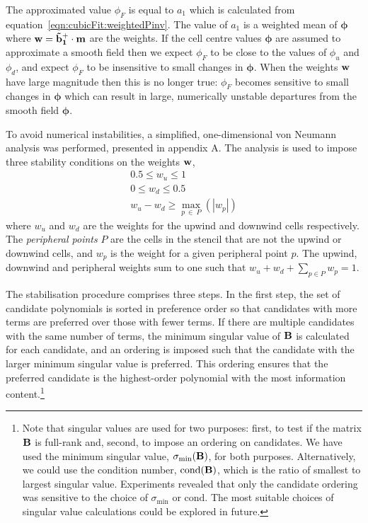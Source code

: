 The approximated value $\phi_F$ is equal to $a_1$ which is calculated from equation~\eqref{eqn:cubicFit:weightedPinv}.  The value of $a_1$ is a weighted mean of $\bm{\phi}$ where $\mathbf{w} = \mathbf{\tilde{b}_1^+} \cdot \mathbf{m}$ are the weights.
If the cell centre values $\bm{\phi}$ are assumed to approximate a smooth field then we expect $\phi_F$ to be close to the values of $\phi_u$ and $\phi_d$, and expect $\phi_F$ to be insensitive to small changes in $\bm{\phi}$.
When the weights $\mathbf{w}$ have large magnitude then this is no longer true: $\phi_F$ becomes sensitive to small changes in $\bm{\phi}$ which can result in large, numerically unstable departures from the smooth field $\bm{\phi}$.

To avoid numerical instabilities, a simplified, one-dimensional von Neumann analysis was performed, presented in appendix A.  The analysis is used to impose three stability conditions on the weights $\mathbf{w}$,
\begin{subequations}
\label{eqn:cubicFit:stability}
\begin{align}
	0.5 \leq w_u \leq 1 \label{eqn:cubicFit:stabilityU} \\
	0 \leq w_d \leq 0.5 \label{eqn:cubicFit:stabilityD} \\
	w_u - w_d \geq \max_{p\:\in\:P}(|w_p|)
\end{align}
\end{subequations}
where $w_u$ and $w_d$ are the weights for the upwind and downwind cells respectively.  The \textit{peripheral points} $P$ are the cells in the stencil that are not the upwind or downwind cells, and $w_p$ is the weight for a given peripheral point $p$.
 The upwind, downwind and peripheral weights sum to one such that $w_u + w_d + \sum_{p \in P} w_p = 1$.

The stabilisation procedure comprises three steps.  In the first step, the set of candidate polynomials is sorted in preference order so that candidates with more terms are preferred over those with fewer terms.
If there are multiple candidates with the same number of terms, the minimum singular value of $\mathbf{B}$ is calculated for each candidate, and an ordering is imposed such that the candidate with the larger minimum singular value is preferred.  This ordering ensures that the preferred candidate is the highest-order polynomial with the most information content.\footnote{Note that singular values are used for two purposes: first, to test if the matrix $\mathbf{B}$ is full-rank and, second, to impose an ordering on candidates.
We have used the minimum singular value, $\sigma_\mathrm{min}(\mathbf{B})$, for both purposes.  Alternatively, we could use the condition number, $\mathrm{cond}(\mathbf{B})$, which is the ratio of smallest to largest singular value.
Experiments revealed that only the candidate ordering was sensitive to the choice of $\sigma_\mathrm{min}$ or $\mathrm{cond}$.
The most suitable choices of singular value calculations could be explored in future.}

